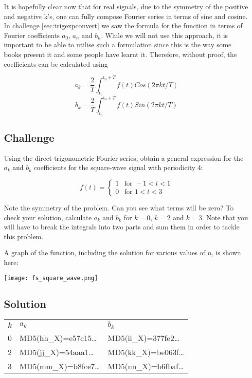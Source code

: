 It is hopefully clear now that for real signals, due to the symmetry of the positive and negative k's, one can fully compose Fourier series in terms of sine and cosine. In challenge \ref{sec:trigexpconvert} we saw the formula for the function in terms of Fourier coefficients $a_0$, $a_n$ and $b_n$. While we will not use this approach, it is important to be able to utilise such a formulation since this is the way some books present it and some people have learnt it. Therefore, without proof, the coefficients can be calculated using

\begin{equation}
    a_k = \frac{2}{T} \int_{t_0}^{t_0+T} f(t) Cos(2 \pi k t/T)
\end{equation}
\begin{equation}
    b_k = \frac{2}{T} \int_{t_0}^{t_0+T} f(t) Sin(2 \pi k t/T)
\end{equation}

\subsection*{Challenge}
Using the direct trigonometric Fourier series, obtain a general expression for the $a_k$ and $b_k$ coefficients for the square-wave signal with periodicity 4:

\begin{equation}
    f(t)=
    \begin{cases}
        1 & \text{for } -1<t<1 \\
        0 & \text{for } 1<t<3
    \end{cases}
\end{equation}

Note the symmetry of the problem. Can you see what terms will be zero? To check your solution, calculate $a_k$ and $b_k$ for $k=0$, $k=2$ and $k=3$. Note that you will have to break the integrals into two parts and sum them in order to tackle this problem.

A graph of the function, including the solution for various values of $n$, is shown here:

\texttt{[image: fs\_square\_wave.png]}

\subsection*{Solution}
\begin{tabular}{|l|l|l|}
    \hline
    $k$ & $a_k$ & $b_k$ \\
    \hline
    0 & MD5(hh\_X)=e57c15\ldots & MD5(ii\_X)=377fe2\ldots \\
    2 & MD5(jj\_X)=54aaa1\ldots & MD5(kk\_X)=be063f\ldots \\
    3 & MD5(mm\_X)=b8fce7\ldots & MD5(nn\_X)=b6fbaf\ldots \\
    \hline
\end{tabular}

